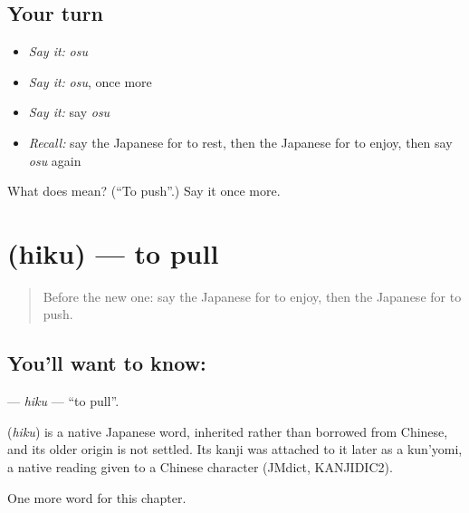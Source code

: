 \subsection*{Your turn}
\begin{itemize}
\raggedright
  \item \emph{Say it:} \emph{osu}
  \item \emph{Say it:} \emph{osu}, once more
  \item \emph{Say it:} say \emph{osu}
  \item \emph{Recall:} say the Japanese for to rest, then the Japanese for to enjoy, then say \emph{osu} again
\end{itemize}

\begin{tcolorbox}[breakable,colback=teal!4,colframe=teal!35!black,title={Before you move on}]
What does  mean? (\textquotedblleft{}To push\textquotedblright{}.) Say it once more.
\end{tcolorbox}
\section[\texorpdfstring{\ja{ひく} (hiku)}{ひく (hiku)}]{ (hiku) — to pull}

\label{lesson:JA-C30-hiku}



\begin{quote}
Before the new one: say the Japanese for to enjoy, then the Japanese for to push.
\end{quote}

\subsection*{You'll want to know: }
\textbf{} — \emph{hiku} — \textquotedblleft{}to pull\textquotedblright{}.

\begin{cousinweb}
\textbf{} (\emph{hiku}) is a native Japanese word, inherited rather than borrowed from Chinese, and its older origin is not settled. Its kanji was attached to it later as a kun'yomi, a native reading given to a Chinese character (JMdict, KANJIDIC2).
\end{cousinweb}

\begin{grammarlens}[title={What you've built}]
One more word for this chapter.
\end{grammarlens}

